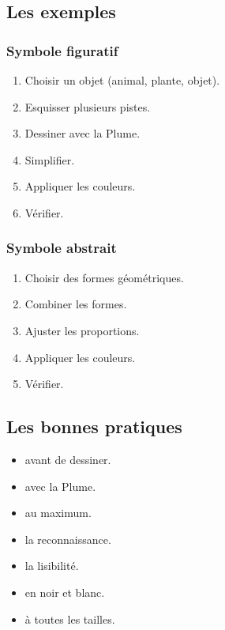 \subsection{Les exemples}

\subsubsection{Symbole figuratif}

\begin{enumerate}
    \item Choisir un objet (animal, plante, objet).
    \item Esquisser plusieurs pistes.
    \item Dessiner avec la Plume.
    \item Simplifier.
    \item Appliquer les couleurs.
    \item Vérifier.
\end{enumerate}

\subsubsection{Symbole abstrait}

\begin{enumerate}
    \item Choisir des formes géométriques.
    \item Combiner les formes.
    \item Ajuster les proportions.
    \item Appliquer les couleurs.
    \item Vérifier.
\end{enumerate}

\subsection{Les bonnes pratiques}

\begin{itemize}
    \item {} avant de dessiner.
    \item {} avec la Plume.
    \item {} au maximum.
    \item {} la reconnaissance.
    \item {} la lisibilité.
    \item {} en noir et blanc.
    \item {} à toutes les tailles.
\end{itemize}

